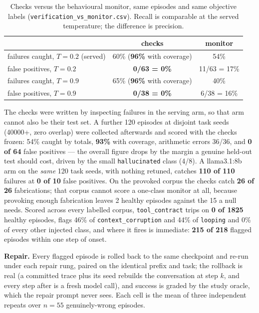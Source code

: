 \documentclass{article}
\begin{document}
\begin{table}[h]
\centering
\caption{Checks versus the behavioural monitor, same episodes and same objective
labels (\texttt{verification\_vs\_monitor.csv}). Recall is comparable at the
served temperature; the difference is precision.}
\label{tab:verify}
\begin{tabular}{lcc}
\toprule
 & checks & monitor \\
\midrule
failures caught, $T{=}0.2$ (served) & 60\% (\textbf{96\%} with coverage) & 54\% \\
false positives, $T{=}0.2$ & \textbf{0/63 = 0\%} & 11/63 = 17\% \\
failures caught, $T{=}0.9$ & 65\% (\textbf{96\%} with coverage) & 40\% \\
false positives, $T{=}0.9$ & \textbf{0/38 = 0\%} & 6/38 = 16\% \\
\bottomrule
\end{tabular}
\end{table}

The checks were written by inspecting failures in the serving arm, so that arm
cannot also be their test set. A further 120 episodes at disjoint task seeds
(40000+, zero overlap) were collected afterwards and scored with the checks
frozen: 54\% caught by totals, \textbf{93\%} with coverage, arithmetic errors
36/36, and \textbf{0 of 64} false positives --- the overall figure drops by the
margin a genuine held-out test should cost, driven by the small
\texttt{hallucinated} class (4/8). A llama3.1:8b arm on the \emph{same} 120 task
seeds, with nothing retuned, catches \textbf{110 of 110} failures at \textbf{0 of
10} false positives. On the provoked corpus the checks catch \textbf{26 of 26}
fabrications; that corpus cannot score a one-class monitor at all, because
provoking enough fabrication leaves 2 healthy episodes against the 15 a null
needs. Scored across every labelled corpus, \texttt{tool\_contract} trips on
\textbf{0 of 1825} healthy episodes, flags 46\% of \texttt{context\_corruption}
and 44\% of \texttt{looping} and 0\% of every other injected class, and where it
fires is immediate: \textbf{215 of 218} flagged episodes within one step of onset.

\textbf{Repair.} Every flagged episode is rolled back to the same checkpoint and
re-run under each repair rung, paired on the identical prefix and task; the
rollback is real (a committed trace plus its seed rebuilds the conversation at
step $k$, and every step after is a fresh model call), and success is graded by
the study oracle, which the repair prompt never sees. Each cell is the mean of
three independent repeats over $n=55$ genuinely-wrong episodes.
\end{document}
